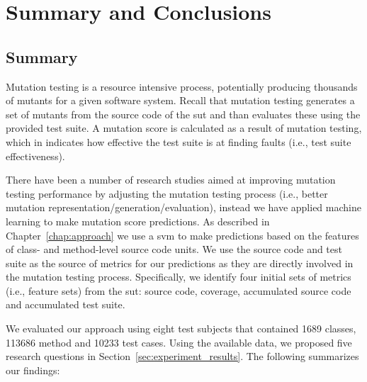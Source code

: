 \chapter{Summary and Conclusions}
\label{chap:conclusions}


\section{Summary}
\label{sec:conclusions_summary}
Mutation testing is a resource intensive process, potentially producing thousands of mutants for a given software system. Recall that mutation testing generates a set of mutants from the source code of the \gls{sut} and than evaluates these using the provided test suite. A mutation score is calculated as a result of mutation testing, which in indicates how effective the test suite is at finding faults (i.e., test suite effectiveness).

There have been a number of research studies aimed at improving mutation testing performance by adjusting the mutation testing process (i.e., better mutation representation/generation/evaluation), instead we have applied machine learning to make mutation score predictions. As described in Chapter~\ref{chap:approach} we use a \gls{svm} to make predictions based on the features of class- and method-level source code units. We use the source code and test suite as the source of metrics for our predictions as they are directly involved in the mutation testing process. Specifically, we identify four initial sets of metrics (i.e., feature sets) from the \gls{sut}: source code, coverage, accumulated source code and accumulated test suite.

We evaluated our approach using eight test subjects that contained 1689 classes, 113686 method and 10233 test cases. Using the available data, we proposed five research questions in Section~\ref{sec:experiment_results}. The following summarizes our findings:

